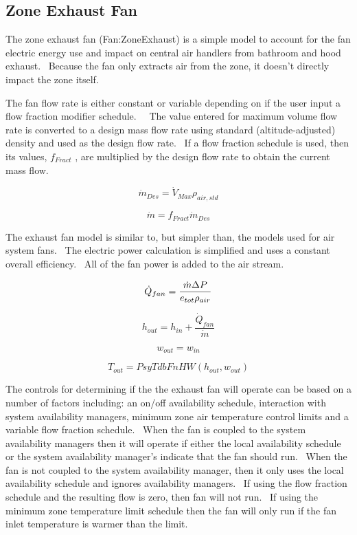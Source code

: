 \subsection{Zone Exhaust Fan}\label{zone-exhaust-fan}

The zone exhaust fan (Fan:ZoneExhaust) is a simple model to account for the fan electric energy use and impact on central air handlers from bathroom and hood exhaust.~ Because the fan only extracts air from the zone, it doesn't directly impact the zone itself.

The fan flow rate is either constant or variable depending on if the user input a flow fraction modifier schedule.~~ The value entered for maximum volume flow rate is converted to a design mass flow rate using standard (altitude-adjusted) density and used as the design flow rate.~ If a flow fraction schedule is used, then its values, \({f_{Fract}}\) , are multiplied by the design flow rate to obtain the current mass flow.

\begin{equation}
{\dot m_{Des}} = {\dot V_{Max}}{\rho_{air,std}}
\end{equation}

\begin{equation}
\dot m = {f_{Fract}}{\dot m_{Des}}
\end{equation}

The exhaust fan model is similar to, but simpler than, the models used for air system fans.~ The electric power calculation is simplified and uses a constant overall efficiency.~ All of the fan power is added to the air stream.

\begin{equation}
{\dot Q_{fan}} = \frac{{\dot m{\rm{}}\Delta P}}{{{e_{tot}}{\rho_{air}}}}
\end{equation}

\begin{equation}
{h_{out}} = {h_{in}} + \frac{{{{\dot Q}_{fan}}}}{{\dot m}}
\end{equation}

\begin{equation}
{w_{out}} = {w_{in}}
\end{equation}

\begin{equation}
{T_{out}} = PsyTdbFnHW\left( {{h_{out}},{w_{out}}} \right)
\end{equation}

The controls for determining if the the exhaust fan will operate can be based on a number of factors including: an on/off availability schedule, interaction with system availability managers, minimum zone air temperature control limits and a variable flow fraction schedule.~ When the fan is coupled to the system availability managers then it will operate if either the local availability schedule or the system availability manager's indicate that the fan should run.~ When the fan is not coupled to the system availability manager, then it only uses the local availability schedule and ignores availability managers.~ If using the flow fraction schedule and the resulting flow is zero, then fan will not run.~ If using the minimum zone temperature limit schedule then the fan will only run if the fan inlet temperature is warmer than the limit.

